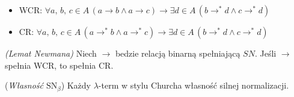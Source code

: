 \begin{itemize}
\item WCR: \(\forall a,\,b,\,c\in A\, (a\longrightarrow b \land a\longrightarrow c)\to \exists d\in A\,(b\longrightarrow^{*} d \land c\longrightarrow^{*} d)\)
\item CR: \(\forall a,\,b,\,c\in A\, (a\longrightarrow^{*} b \land a\longrightarrow^{*}c)\to \exists d\in A\,(b\longrightarrow^{*} d \land c\longrightarrow^{*} d)\)
\end{itemize}
\begin{twierdzenie} 
  \emph{(Lemat Newmana)} Niech \(\to\) bedzie relacją binarną spełniającą \(SN\). Jeśli \(\to\) spełnia WCR, to spełnia CR.
\end{twierdzenie}
\begin{dowod}
\end{dowod}

\begin{twierdzenie} 
  (\emph{Własność \(\mathrm{SN}_{\beta}\)}) Każdy \(\lambda\)-term w stylu Churcha własność silnej normalizacji.
\end{twierdzenie}
\begin{dowod}
\end{dowod}

